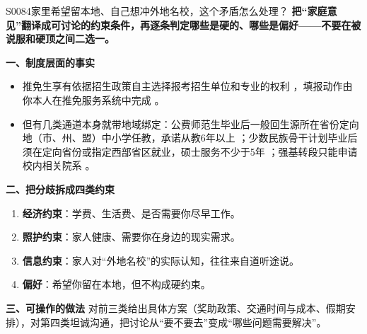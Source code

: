 \begin{qa}{S0084}{家里希望留本地、自己想冲外地名校，这个矛盾怎么处理？}
\textbf{把“家庭意见”翻译成可讨论的约束条件，再逐条判定哪些是硬的、哪些是偏好——不要在被说服和硬顶之间二选一。}

\textbf{一、制度层面的事实}
\begin{itemize}
  \item 推免生享有依据招生政策自主选择报考招生单位和专业的权利 ，填报动作由你本人在推免服务系统中完成 。
  \item 但有几类通道本身就带地域绑定：公费师范生毕业后一般回生源所在省份定向地（市、州、盟）中小学任教，承诺从教6年以上 ；少数民族骨干计划毕业后须在定向省份或指定西部省区就业，硕士服务不少于5年 ；强基转段只能申请校内相关院系 。
\end{itemize}

\textbf{二、把分歧拆成四类约束}
\begin{enumerate}
  \item \textbf{经济约束}：学费、生活费、是否需要你尽早工作。
  \item \textbf{照护约束}：家人健康、需要你在身边的现实需求。
  \item \textbf{信息约束}：家人对“外地名校”的实际认知，往往来自道听途说。
  \item \textbf{偏好}：希望你留在本地，但不构成硬约束。
\end{enumerate}

\textbf{三、可操作的做法}
对前三类给出具体方案（奖助政策、交通时间与成本、假期安排），对第四类坦诚沟通，把讨论从“要不要去”变成“哪些问题需要解决”。
\end{qa}


